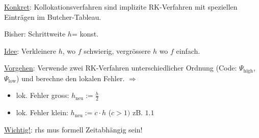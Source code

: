 \vspace{1\baselineskip}

\underline{Konkret}:
Kollokationsverfahren sind implizite RK-Verfahren mit speziellen Einträgen im
Butcher-Tableau.

\vspace{1\baselineskip}


\vspace{1\baselineskip}

\underline{}

Bisher: Schrittweite $h$= konst.

\underline{Idee}: Verkleinere $h$, wo $f$ schwierig, vergrössere $h$ wo $f$ einfach.

\underline{Vorgehen}: Verwende zwei RK-Verfahren unterschiedlicher Ordnung
(Code: $\Psi_{\text{high}}$, $\Psi_{\text{low}}$) und berechne den lokalen Fehler.
$\Rightarrow$
\begin{itemize}
    \item lok. Fehler gross: $h_{\text{neu}} := \frac{h}{2}$
    \item lok. Fehler klein: $h_{\text{neu}} := c \cdot h$ ($c > 1)$ zB. $1.1$
\end{itemize}

\underline{Wichtig!}: rhs mus formell Zeitabhängig sein!
